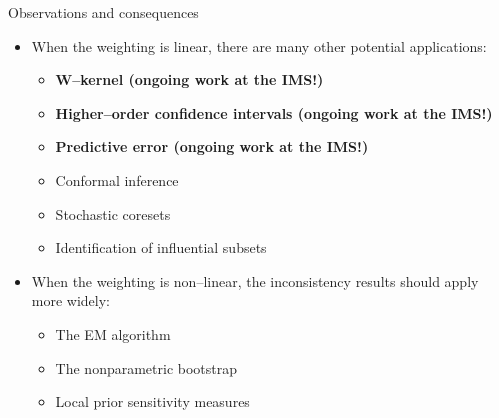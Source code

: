 \begin{frame}{Observations and consequences}
\pause
\begin{itemize}
    \item When the weighting is linear, there are many other potential applications:
    \begin{itemize}
        \item \textbf{W--kernel (ongoing work at the IMS!)}
        \item \textbf{Higher--order confidence intervals (ongoing work at the IMS!)}
        \item \textbf{Predictive error (ongoing work at the IMS!)}
        \item Conformal inference
        \item Stochastic coresets
        \item Identification of influential subsets
    \end{itemize}
    \item When the weighting is non--linear, the inconsistency results 
    should apply more widely:
    \begin{itemize}
        \item The EM algorithm
        \item The nonparametric bootstrap
        \item Local prior sensitivity measures
    \end{itemize}
\end{itemize}

\end{frame}




